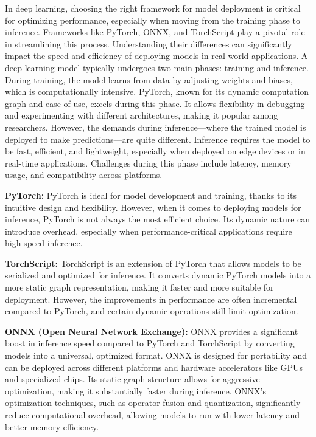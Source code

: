 In deep learning, choosing the right framework for model deployment is critical for optimizing performance, especially when moving from the training phase to inference.
Frameworks like PyTorch, ONNX, and TorchScript play a pivotal role in streamlining this process.
Understanding their differences can significantly impact the speed and efficiency of deploying models in real-world applications.
A deep learning model typically undergoes two main phases: training and inference.
During training, the model learns from data by adjusting weights and biases, which is computationally intensive.
PyTorch, known for its dynamic computation graph and ease of use, excels during this phase.
It allows flexibility in debugging and experimenting with different architectures, making it popular among researchers.
However, the demands during inference—where the trained model is deployed to make predictions—are quite different.
Inference requires the model to be fast, efficient, and lightweight, especially when deployed on edge devices or in real-time applications.
Challenges during this phase include latency, memory usage, and compatibility across platforms.

\textbf{PyTorch:} PyTorch is ideal for model development and training, thanks to its intuitive design and flexibility.
However, when it comes to deploying models for inference, PyTorch is not always the most efficient choice.
Its dynamic nature can introduce overhead, especially when performance-critical applications require high-speed inference.

\textbf{TorchScript:} TorchScript is an extension of PyTorch that allows models to be serialized and optimized for inference.
It converts dynamic PyTorch models into a more static graph representation, making it faster and more suitable for deployment.
However, the improvements in performance are often incremental compared to PyTorch, and certain dynamic operations still limit optimization.

\textbf{ONNX (Open Neural Network Exchange):} ONNX provides a significant boost in inference speed compared to PyTorch and TorchScript by converting models into a universal, optimized format.
ONNX is designed for portability and can be deployed across different platforms and hardware accelerators like GPUs and specialized chips.
Its static graph structure allows for aggressive optimization, making it substantially faster during inference.
ONNX's optimization techniques, such as operator fusion and quantization, significantly reduce computational overhead, allowing models to run with lower latency and better memory efficiency.


